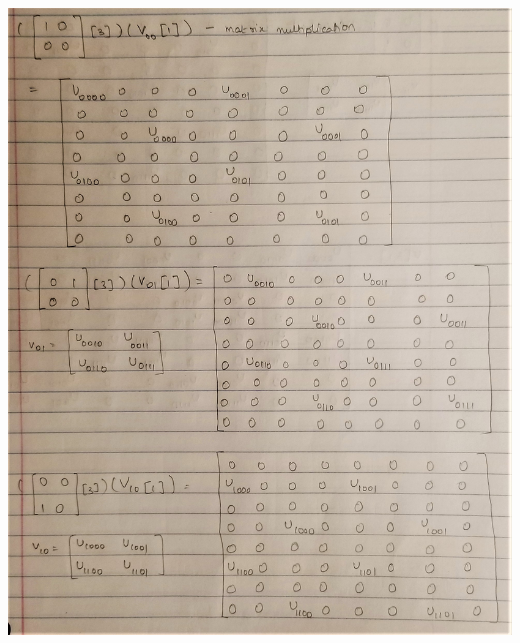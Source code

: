 \documentclass [12pt]{article}
\theoremstyle{definition}
\begin{document}
\includegraphics[width=18cm, height=23cm]{I33}\\
\end{document}

